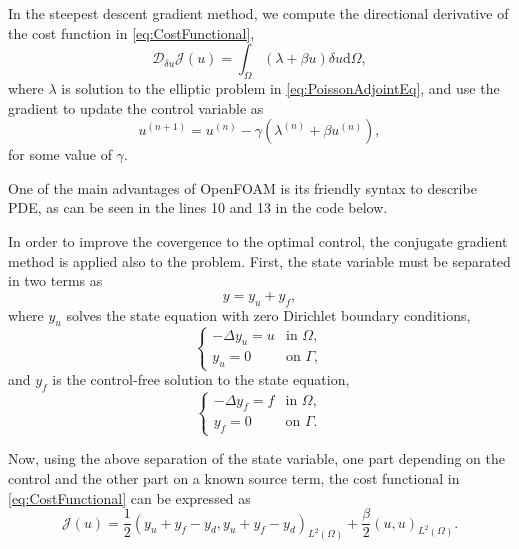 \documentclass[10pt,a4paper]{article}
\newcommand{\drm}{\mathrm{d}}
\begin{document}
In the steepest descent gradient method, we compute the directional derivative of the cost function in \eqref{eq:CostFunctional},
%
\begin{equation}
\mathcal{D}_{ \delta u} \mathcal{J} \left( u \right) = \int_{\Omega} \left( \lambda + \beta u \right) \delta u \drm \Omega,
\end{equation}
%
where $\lambda$ is solution to the elliptic problem in \eqref{eq:PoissonAdjointEq}, and use the gradient to update the control variable as
%
\begin{equation}
u^{\left( n + 1 \right)} = u^{\left( n \right)} - \gamma \left( \lambda^{\left( n \right)} + \beta u^{\left( n \right)} \right),
\end{equation}
%
for some value of $\gamma$.

One of the main advantages of OpenFOAM is its friendly syntax to describe PDE, as can be seen in the lines 10 and 13 in the code below.



In order to improve the covergence to the optimal control, the conjugate gradient method is applied also to the problem. First, the state variable must be separated in two terms as
%
\begin{equation}
y = y_u + y_{f},
\end{equation}
%
where $y_u$ solves the state equation with zero Dirichlet boundary conditions,
%
\begin{equation} \label{eq:PoissonEqu}
\begin{cases}
-\Delta y_u  = u & \text{in } \Omega, \\
y_u = 0 & \text{on } \Gamma,
\end{cases}
\end{equation}
%
and $y_{f}$ is the control-free solution to the state equation,
%
\begin{equation} \label{eq:PoissonEq0}
\begin{cases}
-\Delta y_{f}  = f & \text{in } \Omega, \\
y_{f} = 0 & \text{on } \Gamma.
\end{cases}
\end{equation}

Now, using the above separation of the state variable, one part depending on the control and the other part on a known source term, the cost functional in \eqref{eq:CostFunctional} can be expressed as
%
\begin{equation} \label{eq:CostFunctionalcg}
\mathcal{J} \left( u \right) = \frac{1}{2} \left( y_u + y_f - y_d, y_u + y_f - y_d \right)_{L^2\left( \Omega \right)} + \frac{\beta}{2} \left( u , u \right) _{L^2\left( \Omega \right)}.
\end{equation}
\end{document}

